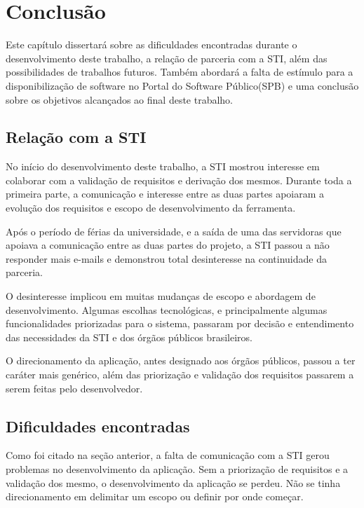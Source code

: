 \chapter[Conclusão]{Conclusão}

Este capítulo dissertará sobre as dificuldades encontradas durante o desenvolvimento deste trabalho, a relação de parceria com a STI, além das possibilidades de trabalhos futuros. Também abordará a falta de estímulo para a disponibilização de software no Portal do Software Público(SPB) e uma conclusão sobre os objetivos alcançados ao final deste trabalho.

\section{Relação com a STI}

No início do desenvolvimento deste trabalho, a STI mostrou interesse em colaborar com a validação de requisitos e derivação dos mesmos. Durante toda a primeira parte, a comunicação e interesse entre as duas partes apoiaram a evolução dos requisitos e escopo de desenvolvimento da ferramenta.

Após o período de férias da universidade, e a saída de uma das servidoras que apoiava a comunicação entre as duas partes do projeto, a STI passou a não responder mais e-mails e demonstrou total desinteresse na continuidade da parceria.

O desinteresse implicou em muitas mudanças de escopo e abordagem de desenvolvimento. Algumas escolhas tecnológicas, e principalmente algumas funcionalidades priorizadas para o sistema, passaram por decisão e entendimento das necessidades da STI e dos órgãos públicos brasileiros.

O direcionamento da aplicação, antes designado aos órgãos públicos, passou a ter caráter mais genérico, além das priorização e validação dos requisitos passarem a serem feitas pelo desenvolvedor.

\section{Dificuldades encontradas}

Como foi citado na seção anterior, a falta de comunicação com a STI gerou problemas no desenvolvimento da aplicação. Sem a priorização de requisitos e a validação dos mesmo, o desenvolvimento da aplicação se perdeu. Não se tinha direcionamento em delimitar um escopo ou definir por onde começar.

